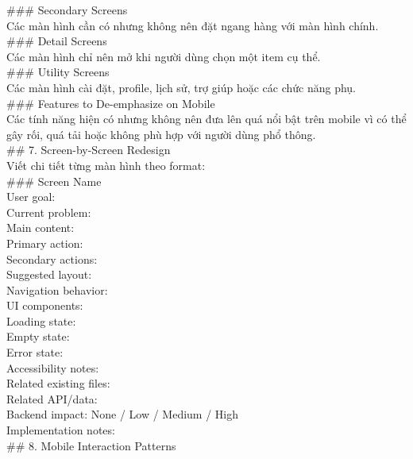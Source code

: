 \begin{enumerate}
\#\#\# Secondary Screens \\

Các màn hình cần có nhưng không nên đặt ngang hàng với màn hình chính. \\

\#\#\# Detail Screens \\

Các màn hình chỉ nên mở khi người dùng chọn một item cụ thể. \\

\#\#\# Utility Screens \\

Các màn hình cài đặt, profile, lịch sử, trợ giúp hoặc các chức năng phụ. \\

\#\#\# Features to De-emphasize on Mobile \\

Các tính năng hiện có nhưng không nên đưa lên quá nổi bật trên mobile vì có thể gây rối, quá tải hoặc không phù hợp với người dùng phổ thông. \\

\#\# 7. Screen-by-Screen Redesign \\

Viết chi tiết từng màn hình theo format: \\

\#\#\# Screen Name \\
\* User goal: \\
\* Current problem: \\
\* Main content: \\
\* Primary action: \\
\* Secondary actions: \\
\* Suggested layout: \\
\* Navigation behavior: \\
\* UI components: \\
\* Loading state: \\
\* Empty state: \\
\* Error state: \\
\* Accessibility notes: \\
\* Related existing files: \\
\* Related API/data: \\
\* Backend impact: None / Low / Medium / High \\
\* Implementation notes: \\


\#\# 8. Mobile Interaction Patterns \\


\end{enumerate}

